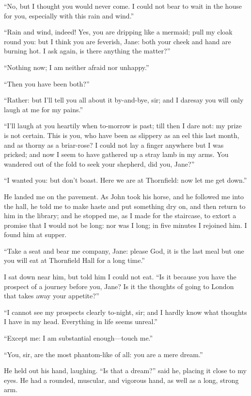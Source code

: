 \enquote{No, but I thought you would never come.  I could not bear to
wait in the house for you, especially with this rain and wind.}

\enquote{Rain and wind, indeed!  Yes, you are dripping like a mermaid;
pull my cloak round you: but I think you are feverish, Jane: both your
cheek and hand are burning hot.  I ask again, is there anything the
matter?}

\enquote{Nothing now; I am neither afraid nor unhappy.}

\enquote{Then you have been both?}

\enquote{Rather: but I'll tell you all about it by-and-bye, sir; and I
daresay you will only laugh at me for my pains.}

\enquote{I'll laugh at you heartily when to-morrow is past; till then I
dare not: my prize is not certain.  This is you, who have been as
slippery as an eel this last month, and as thorny as a briar-rose?  I
could not lay a finger anywhere but I was pricked; and now I seem to
have gathered up a stray lamb in my arms.  You wandered out of the fold
to seek your shepherd, did you, Jane?}

\enquote{I wanted you: but don't boast.  Here we are at Thornfield: now
let me get down.}

He landed me on the pavement.  As John took his horse, and he followed
me into the hall, he told me to make haste and put something dry on, and
then return to him in the library; and he stopped me, as I made for the
staircase, to extort a promise that I would not be long: nor was I long;
in five minutes I rejoined him.  I found him at supper.

\enquote{Take a seat and bear me company, Jane: please God, it is the
last meal but one you will eat at Thornfield Hall for a long time.}

I sat down near him, but told him I could not eat.  \enquote{Is it
because you have the prospect of a journey before you, Jane?  Is it the
thoughts of going to London that takes away your appetite?}

\enquote{I cannot see my prospects clearly to-night, sir; and I hardly
know what thoughts I have in my head.  Everything in life seems unreal.}

\enquote{Except me: I am substantial enough---touch me.}

\enquote{You, sir, are the most phantom-like of all: you are a mere
dream.}

He held out his hand, laughing.  \enquote{Is that a dream?} said he,
placing it close to my eyes.  He had a rounded, muscular, and vigorous
hand, as well as a long, strong arm.

